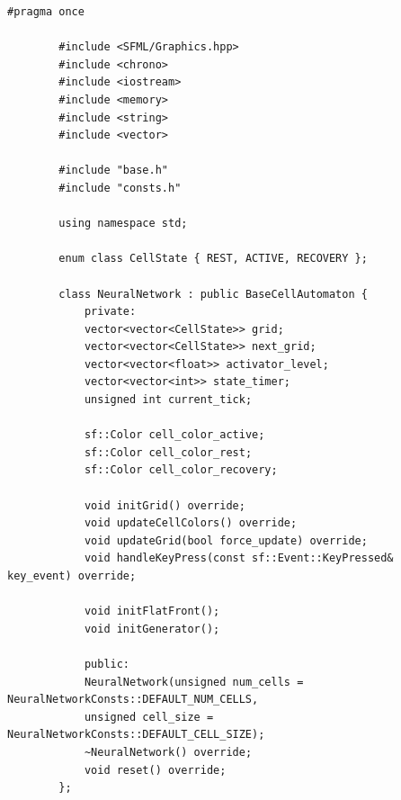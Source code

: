 \documentclass[14pt,a4paper]{extarticle}
\theoremstyle{plain}
\begin{document}
	\begin{lstlisting}[title=neural.h, gobble=16, breaklines=true, showspaces=false, showtabs=false, breakatwhitespace=true]
		#pragma once
		
		#include <SFML/Graphics.hpp>
		#include <chrono>
		#include <iostream>
		#include <memory>
		#include <string>
		#include <vector>
		
		#include "base.h"
		#include "consts.h"
		
		using namespace std;
		
		enum class CellState { REST, ACTIVE, RECOVERY };
		
		class NeuralNetwork : public BaseCellAutomaton {
			private:
			vector<vector<CellState>> grid;
			vector<vector<CellState>> next_grid;
			vector<vector<float>> activator_level;
			vector<vector<int>> state_timer;
			unsigned int current_tick;
			
			sf::Color cell_color_active;
			sf::Color cell_color_rest;
			sf::Color cell_color_recovery;
			
			void initGrid() override;
			void updateCellColors() override;
			void updateGrid(bool force_update) override;
			void handleKeyPress(const sf::Event::KeyPressed& key_event) override;
			
			void initFlatFront();
			void initGenerator();
			
			public:
			NeuralNetwork(unsigned num_cells = NeuralNetworkConsts::DEFAULT_NUM_CELLS,
			unsigned cell_size = NeuralNetworkConsts::DEFAULT_CELL_SIZE);
			~NeuralNetwork() override;
			void reset() override;
		};
	\end{lstlisting}
	
\end{document}
